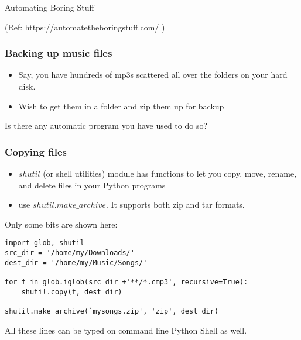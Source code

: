 \begin{frame}[fragile]\frametitle{}
\begin{center}
{\Large Automating Boring Stuff}

\tiny{ (Ref: https://automatetheboringstuff.com/ )}
\end{center}


\end{frame}


\begin{frame}[fragile]\frametitle{Backing up music files}
\begin{itemize}
\item Say, you have hundreds of mp3s scattered all over the folders on your hard disk.
\item Wish to get them in a folder and zip them up for backup
\end{itemize}
Is there any automatic program you have used to do so?
\end{frame}

\begin{frame}[fragile]\frametitle{Copying files}
\begin{itemize}
\item $shutil$ (or shell utilities) module has functions to let you copy, move, rename, and delete files in your Python programs
\item use $shutil.make\_archive$. It supports both zip and tar formats.
\end{itemize}
Only some bits are shown here:
\begin{lstlisting}
import glob, shutil 
src_dir = '/home/my/Downloads/'
dest_dir = '/home/my/Music/Songs/'

for f in glob.iglob(src_dir +'**/*.cmp3', recursive=True):
    shutil.copy(f, dest_dir)
    
shutil.make_archive(`mysongs.zip', 'zip', dest_dir)
\end{lstlisting}
All these lines can be typed on command line Python Shell as well.
\end{frame}